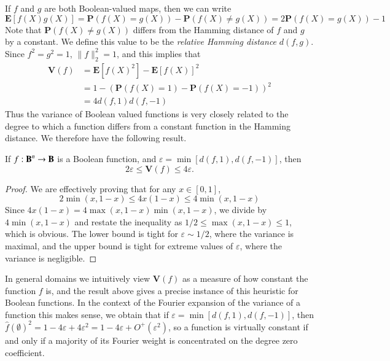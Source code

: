 If $f$ and $g$ are both Boolean-valued maps, then we can write
%
\[ \mathbf{E}[f(X)g(X)] = \mathbf{P}(f(X) = g(X)) - \mathbf{P}(f(X) \neq g(X)) = 2\mathbf{P}(f(X) = g(X)) - 1 \]
%
Note that $\mathbf{P}(f(X) \neq g(X))$ differs from the Hamming distance of $f$ and $g$ by a constant. We define this value to be the \emph{relative Hamming distance} $d(f,g)$. Since $f^2 = g^2 = 1$, $\| f \|_2^2 = 1$, and this implies that
%
\begin{align*}
    \mathbf{V}(f) &= \mathbf{E}[f(X)^2] - \mathbf{E}[f(X)]^2\\
    &= 1 - (\mathbf{P}(f(X) = 1) - \mathbf{P}(f(X) = -1))^2\\
    &= 4d(f,1)d(f,-1)
\end{align*}
%
Thus the variance of Boolean valued functions is very closely related to the degree to which a function differs from a constant function in the Hamming distance. We therefore have the following result.

\begin{lemma}
    If $f: \operatorname{\mathbf{B}}^n \to \operatorname{\mathbf{B}}$ is a Boolean function, and $\varepsilon = \min[d(f,1),d(f,-1)]$, then
    \[ 2\varepsilon \leq \mathbf{V}(f) \leq 4\varepsilon. \]
\end{lemma}
\begin{proof}
    We are effectively proving that for any $x \in [0,1]$,
    \[ 2\min(x,1-x) \leq 4x(1-x) \leq 4\min(x,1-x) \]
    Since $4x(1-x) = 4\max(x,1-x)\min(x,1-x)$, we divide by $4\min(x,1-x)$ and restate the inequality as $1/2 \leq \max(x,1-x) \leq 1$, which is obvious. The lower bound is tight for $\varepsilon \sim 1/2$, where the variance is maximal, and the upper bound is tight for extreme values of $\varepsilon$, where the variance is negligible.
\end{proof}

In general domains we intuitively view $\mathbf{V}(f)$ as a measure of how constant the function $f$ is, and the result above gives a precise instance of this heuristic for Boolean functions. In the context of the Fourier expansion of the variance of a function this makes sense, we obtain that if $\varepsilon = \min[d(f,1),d(f,-1)]$, then $\widehat{f}(\emptyset)^2 = 1 - 4\varepsilon + 4\varepsilon^2 = 1 - 4\varepsilon + O^+(\varepsilon^2)$, so a function is virtually constant if and only if a majority of its Fourier weight is concentrated on the degree zero coefficient.

